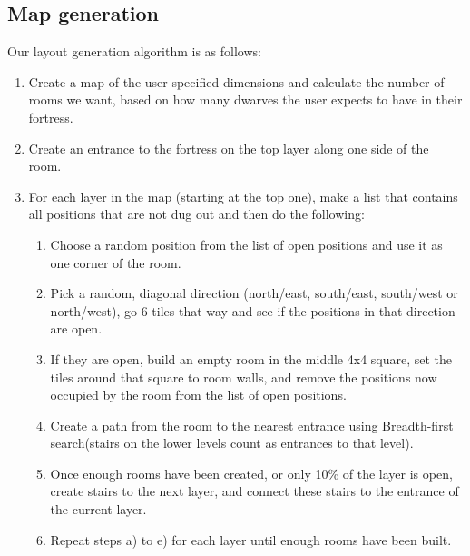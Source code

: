 \subsection{Map generation}
\label{04_MapGeneration}
Our layout generation algorithm is as follows:
\begin{enumerate}

	\item Create a map of the user-specified dimensions and calculate the number of rooms we want, based on how many dwarves the user expects to have in their fortress.

	\item Create an entrance to the fortress on the top layer along one side of the room.

	\item For each layer in the map (starting at the top one), make a list that contains all positions that are not dug out and then do the following:

	\begin{enumerate}
		
		\item Choose a random position from the list of open positions and use it as one corner of the room.

		\item Pick a random, diagonal direction (north/east, south/east, south/west or north/west), go 6 tiles that way and see if the positions in that direction are open.

		\item If they are open, build an empty room in the middle 4x4 square, set the tiles around that square to room walls, and remove the positions now occupied by the room from the list of open positions.

		\item Create a path from the room to the nearest entrance using Breadth-first search\cite{sedgewick4th}\cite{ucibfs}(stairs on the lower levels count as entrances to that level).

		\item Once enough rooms have been created, or only 10\% of the layer is open, create stairs to the next layer, and connect these stairs to the entrance of the current layer.

		\item Repeat steps a) to e) for each layer until enough rooms have been built.

	\end{enumerate}
\end{enumerate}

